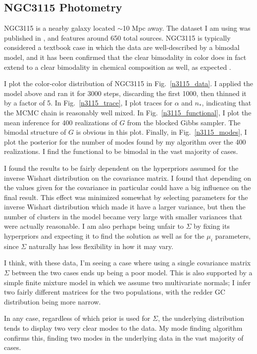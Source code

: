 \documentclass{article}
\begin{document}
\subsection{NGC3115 Photometry}
NGC3115 is a nearby galaxy located $\sim$10 Mpc away. The dataset I am using was published in \citealt{jennings2014},
and features around 650 total sources. NGC3115 is typically considered a textbook case in which the data are well-described
by a bimodal model, and it has been confirmed that the clear bimodality in color does in fact extend to a clear bimodality
in chemical composition as well, as expected \citep{brodie2012}.

I plot the color-color distribution of NGC3115 in Fig.~\ref{n3115_data}. I applied the model above and ran it for
3000 steps, discarding the first 1000, then thinned it by a factor of 5.
In Fig.~\ref{n3115_trace}, I plot traces for $\alpha$ and $n_*$, indicating that
the MCMC chain is reasonably well mixed. In Fig.~\ref{n3115_functional}, I plot the mean inference for 400 realizations
of $G$ from the blocked Gibbs sampler. The bimodal structure of $G$ is obvious in this plot. Finally, in Fig.~\ref{n3115_modes},
I plot the posterior for the number of modes found by my algorithm over the 400 realizations. I find the functional to be bimodal
in the vast majority of cases.

I found the results to be fairly dependent on the hyperpriors assumed for the inverse Wishart distribution on
the covariance matrix. I found that depending on the values given for the covariance in particular could have a big
influence on the final result. This effect was minimized somewhat by selecting parameters for the inverse Wishart
distribution which made it have a larger variance, but then the number of clusters in the model became very large
with smaller variances that were actually reasonable. I am also perhaps being unfair to $\Sigma$ by fixing
its hyperpriors and expecting it to find the solution as well as for the $\mu_i$ parameters, since $\Sigma$
naturally has less flexibility in how it may vary.

I think, with these data, I'm seeing a case where using a
single covariance matrix $\Sigma$ between the two cases ends up being a poor model. This is also supported by
a simple finite mixture model in which we assume two multivariate normals; I infer two fairly different matrices
for the two populations, with the redder GC distribution being more narrow. 

In any case, regardless of which prior is used for $\Sigma$, the underlying distribution tends to display two very
clear modes to the data. My mode finding algorithm confirms this, finding two modes in the underlying data in the
vast majority of cases. 
\end{document}

